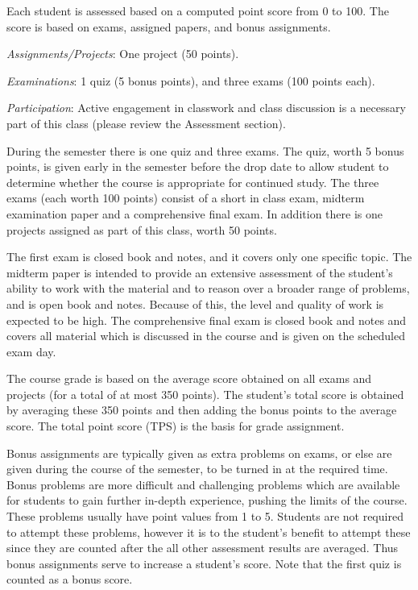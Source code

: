 Each student is assessed based on a computed point score from 0 to 100. The
score is based on exams, assigned papers, and bonus assignments.
\begin{compactenum}
\item
\textit{Assignments/Projects}: One project (50 points).
\item
\textit{Examinations}: 1 quiz (5 bonus points), and three exams (100 points each).
\item
\textit{Participation}: Active engagement in classwork and class discussion
is a necessary part of this class (please review the Assessment section).
\end{compactenum}

During the semester there is one quiz and three exams.
The quiz, worth 5 bonus points, is
given early in the semester before the drop date to allow student to determine
whether the course is appropriate for continued study.
The three exams (each worth 100 points) consist of a short in class exam,
midterm examination paper and a comprehensive final exam.
In addition there is one projects assigned as part of this class,
worth 50 points.

The first exam is closed book and notes, and it covers
only one specific topic.
The midterm paper is intended to provide an extensive assessment of the
student's ability to work with the material and to reason over a broader
range of problems, and is open book and notes.
Because of this, the level and quality of work is expected to be high.
The comprehensive final exam is closed book and notes
and covers all material which is discussed in the
course and is given on the scheduled exam day.

The course grade is based on the
average score obtained on all exams and projects (for a
total of at most 350 points). The student's total score is obtained by
averaging these 350 points and then adding the bonus points
to the average score. The total point  score (TPS) is the basis for grade
assignment.

Bonus assignments are typically given as extra problems on exams,
or else are given during the course of
the semester, to be turned in at the required time. Bonus problems are more
difficult and challenging problems which are available for students to gain
further in-depth experience, pushing the limits of the course.
These problems usually have point values from 1 to 5. Students are
not required to attempt these problems, however it is to the student's benefit
to attempt these since they are counted after the all other assessment
results are averaged. Thus bonus assignments serve to increase a
student's score. Note that the first quiz is counted as a bonus score.

